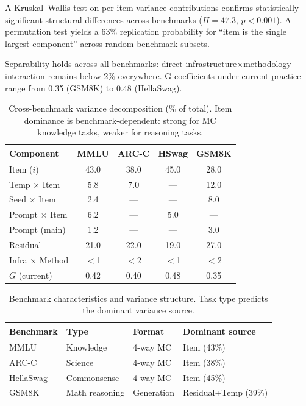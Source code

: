 \documentclass[11pt]{article}
\newcommand{\gcoeff}{G}
\begin{document}
A Kruskal--Wallis test on per-item variance contributions confirms statistically significant structural differences across benchmarks ($H = 47.3$, $p < 0.001$).
A permutation test yields a 63\% replication probability for ``item is the single largest component'' across random benchmark subsets.

Separability holds across all benchmarks: direct infrastructure$\times$methodology interaction remains below 2\% everywhere.
G-coefficients under current practice range from 0.35 (GSM8K) to 0.48 (HellaSwag).

\begin{table}[t]
\centering
\caption{Cross-benchmark variance decomposition (\% of total). Item dominance is benchmark-dependent: strong for MC knowledge tasks, weaker for reasoning tasks.}
\label{tab:cross_benchmark}
\begin{tabular}{lcccc}
\toprule
\textbf{Component} & \textbf{MMLU} & \textbf{ARC-C} & \textbf{HSwag} & \textbf{GSM8K} \\
\midrule
Item ($i$) & 43.0 & 38.0 & 45.0 & 28.0 \\
Temp $\times$ Item & 5.8 & 7.0 & --- & 12.0 \\
Seed $\times$ Item & 2.4 & --- & --- & 8.0 \\
Prompt $\times$ Item & 6.2 & --- & 5.0 & --- \\
Prompt (main) & 1.2 & --- & --- & 3.0 \\
Residual & 21.0 & 22.0 & 19.0 & 27.0 \\
Infra $\times$ Method & $<$1 & $<$2 & $<$1 & $<$2 \\
\midrule
$\gcoeff$ (current) & 0.42 & 0.40 & 0.48 & 0.35 \\
\bottomrule
\end{tabular}
\end{table}

\begin{table}[t]
\centering
\caption{Benchmark characteristics and variance structure. Task type predicts the dominant variance source.}
\label{tab:benchmark_characteristics}
\begin{tabular}{llll}
\toprule
\textbf{Benchmark} & \textbf{Type} & \textbf{Format} & \textbf{Dominant source} \\
\midrule
MMLU & Knowledge & 4-way MC & Item (43\%) \\
ARC-C & Science & 4-way MC & Item (38\%) \\
HellaSwag & Commonsense & 4-way MC & Item (45\%) \\
GSM8K & Math reasoning & Generation & Residual+Temp (39\%) \\
\bottomrule
\end{tabular}
\end{table}
\end{document}
